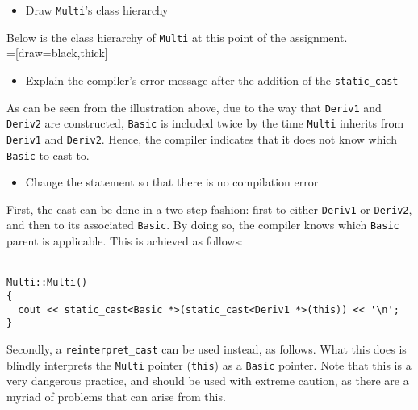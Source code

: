 \begin{itemize}
  \item Draw \texttt{Multi}'s class hierarchy
\end{itemize}
Below is the class hierarchy of \texttt{Multi} at this point of the assignment. \\

=[draw=black,thick]
\tikzset{sibling distance=18pt}

\begin{itemize}
  \item Explain the compiler's error message after the addition of the \texttt{static\_cast}
\end{itemize}

As can be seen from the illustration above, due to the way that \texttt{Deriv1} and \texttt{Deriv2} are constructed, \texttt{Basic} is included twice by the time \texttt{Multi} inherits from \texttt{Deriv1} and \texttt{Deriv2}. Hence, the compiler indicates that it does not know which \texttt{Basic} to cast to.

\begin{itemize}
  \item Change the statement so that there is no compilation error
\end{itemize}
First, the cast can be done in a two-step fashion: first to either \texttt{Deriv1} or \texttt{Deriv2}, and then to its associated \texttt{Basic}. By doing so, the compiler knows which \texttt{Basic} parent is applicable. This is achieved as follows: \\~\\

\begin{lstlisting}[style=in, caption=c\_multi.cc]
Multi::Multi()
{
  cout << static_cast<Basic *>(static_cast<Deriv1 *>(this)) << '\n';
}
\end{lstlisting}

Secondly, a \texttt{reinterpret\_cast} can be used instead, as follows. What this does is blindly interprets the \texttt{Multi} pointer (\texttt{this}) as a \texttt{Basic} pointer. Note that this is a very dangerous practice, and should be used with extreme caution, as there are a myriad of problems that can arise from this. \\~\\


